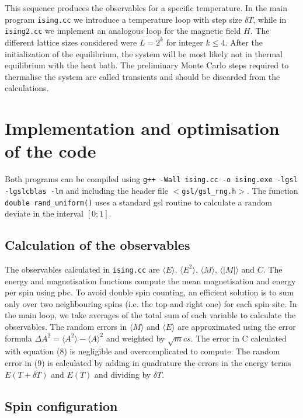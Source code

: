 \documentclass[a4paper]{article}
\begin{document}
This sequence produces the observables for a specific temperature. In the main program \verb;ising.cc; we introduce a temperature loop with step size $\delta T$, while in \verb;ising2.cc; we implement an analogous loop for the magnetic field $H$. The different lattice sizes considered were $L = 2^k$ for integer $k \leq 4 $. After the initialization of the equilibrium, the system will be most likely not in thermal equilibrium with the heat bath. The preliminary Monte Carlo steps required to thermalise the system are called transients and should be discarded from the calculations. 

\section{Implementation and optimisation of the code}

Both programs can be compiled using \verb;g++ -Wall ising.cc -o ising.exe -lgsl; \verb;-lgslcblas -lm; and including the header file $<$\verb+gsl/gsl_rng.h+$>$. The function \verb;double rand_uniform(); uses a standard gsl routine to calculate a random deviate in the interval $[0;1]$. 

\subsection{Calculation of the observables}

The observables calculated in \verb;ising.cc; are $\langle E \rangle$, $\langle E^2 \rangle$, $\langle M \rangle $, $\langle |M| \rangle$ and $C$. The energy and magnetisation functions compute the mean magnetisation and energy per spin using pbc. To avoid double spin counting, an efficient solution is to sum only over two neighbouring spins (i.e. the top and right one) for each spin site. In the main loop, we take averages of the total sum of each variable to calculate the observables. The random errors in $\langle M \rangle $ and $\langle E \rangle$ are approximated using the error formula ${\Delta A}^2 = \langle A^2 \rangle - {\langle A \rangle}^2 $ and weighted by $\sqrt mcs$. The error in C calculated with equation (8) is negligible and overcomplicated to compute. The random error in (9) is calculated by adding in quadrature the errors in the energy terms $E(T+ \delta T)$ and $E(T)$ and dividing by $\delta T$. 


\subsection{Spin configuration }
\end{document}
